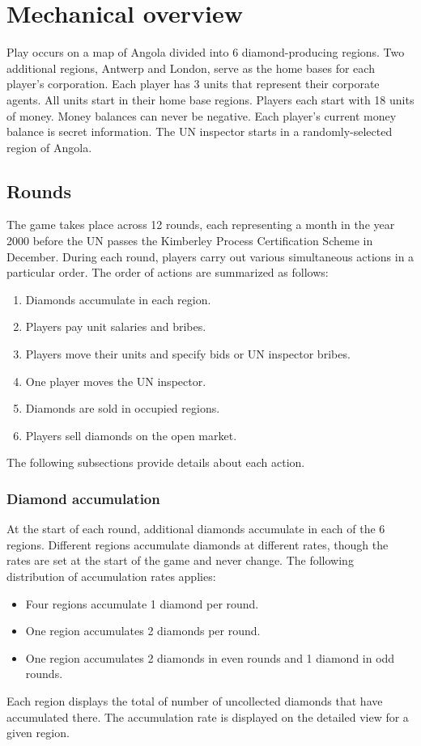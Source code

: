 \documentclass[8pt]{extarticle}
\begin{document}
\section{Mechanical overview}

Play occurs on a map of Angola divided into 6 diamond-producing regions.  Two additional regions, Antwerp and London, serve as the home bases for each player's corporation.  Each player has 3 units that represent their corporate agents.  All units start in their home base regions.  Players each start with 18 units of money.  Money balances can never be negative.  Each player's current money balance is secret information.  The UN inspector starts in a randomly-selected region of Angola.


\subsection{Rounds}

The game takes place across 12 rounds, each representing a month in the year 2000 before the UN passes the Kimberley Process Certification Scheme in December.  During each round, players carry out various simultaneous actions in a particular order.  The order of actions are summarized as follows:
\begin{enumerate}

\item Diamonds accumulate in each region.
\item Players pay unit salaries and bribes.
\item Players move their units and specify bids or UN inspector bribes.
\item One player moves the UN inspector.
\item Diamonds are sold in occupied regions.
\item Players sell diamonds on the open market. 
\end{enumerate}
The following subsections provide details about each action.  


\subsubsection{Diamond accumulation}

At the start of each round, additional diamonds accumulate in each of the 6 regions.  Different regions accumulate diamonds at different rates, though the rates are set at the start of the game and never change.  The following distribution of accumulation rates applies:
\begin{itemize}
\item Four regions accumulate 1 diamond per round.
\item One region accumulates 2 diamonds per round.
\item One region accumulates 2 diamonds in even rounds and 1 diamond in odd rounds.
\end{itemize}
Each region displays the total of number of uncollected diamonds that have accumulated there.  The accumulation rate is displayed on the detailed view for a given region.
\end{document}
